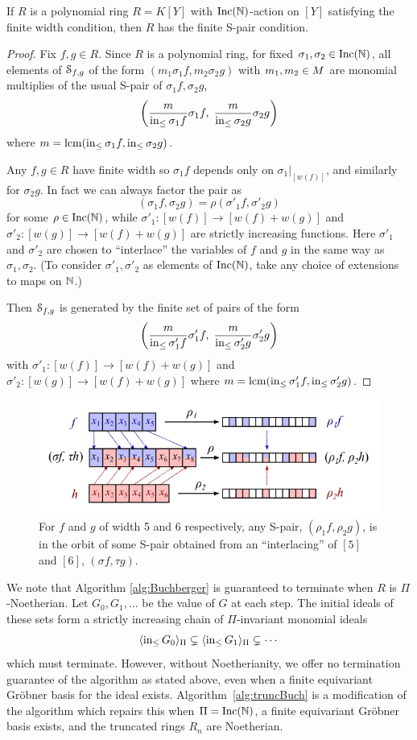 \begin{proposition}
 If $R$ is a polynomial ring $R = K[Y]$ with $\operatorname{Inc}(\mathbb N)$-action on $[Y]$ satisfying the finite width condition, then $R$ has the finite S-pair condition.
\end{proposition}
\begin{proof}
 Fix $f,g \in R$.
 Since $R$ is a polynomial ring, for fixed $\sigma_1,\sigma_2 \in \operatorname{Inc}(\mathbb N)$, all elements of $\mathcal S_{f,g}$ of the form $(m_1\sigma_1 f, m_2\sigma_2 g)$ with $m_1,m_2 \in M$ are monomial multiplies of the usual S-pair of $\sigma_1 f, \sigma_2 g$,
  \[ \left(\frac{m}{\operatorname{in}_{\leq} \sigma_1 f} \sigma_1 f,\; \frac{m}{\operatorname{in}_{\leq} \sigma_2 g} \sigma_2 g\right) \]
 where $m = \operatorname{lcm}(\operatorname{in}_{\leq} \sigma_1 f,\operatorname{in}_{\leq} \sigma_2 g)$.

 Any $f,g \in R$ have finite width so $\sigma_1 f$ depends only on $\sigma_1|_{[w(f)]}$, and similarly for $\sigma_2 g$.  In fact we can always factor the pair as
  \[ (\sigma_1 f, \sigma_2 g) = \rho(\sigma'_1 f, \sigma'_2 g) \]
 for some $\rho \in \operatorname{Inc}(\mathbb N)$, while $\sigma'_1:[w(f)] \to [w(f) + w(g)]$ and $\sigma'_2:[w(g)] \to [w(f) + w(g)]$ are strictly increasing functions.  Here $\sigma'_1$ and $\sigma'_2$ are chosen to ``interlace'' the variables of $f$ and $g$ in the same way as $\sigma_1,\sigma_2$.  (To consider $\sigma'_1,\sigma'_2$ as elements of $\operatorname{Inc}(\mathbb N)$, take any choice of extensions to maps on $\mathbb N$.)
 
 Then $\mathcal S_{f,g}$ is generated by the finite set of pairs of the form
  \[ \left(\frac{m}{\operatorname{in}_{\leq} \sigma'_1 f} \sigma'_1 f,\; \frac{m}{\operatorname{in}_{\leq} \sigma'_2 g} \sigma'_2 g\right) \]
 with $\sigma'_1:[w(f)] \to [w(f) + w(g)]$ and $\sigma'_2:[w(g)] \to [w(f) + w(g)]$ where $m = \operatorname{lcm}(\operatorname{in}_{\leq} \sigma'_1 f,\operatorname{in}_{\leq} \sigma'_2 g)$.
\end{proof}
\begin{figure}[ht]\label{fig:interlace}
  \centering
  \includegraphics[width=.7\columnwidth]{incmap.pdf}
  \caption{For $f$ and $g$ of width 5 and 6 respectively, any S-pair, $(\rho_1 f,\rho_2 g)$, is in the orbit of some S-pair obtained from an ``interlacing'' of $[5]$ and $[6]$, $(\sigma f,\tau g)$.}
\end{figure}

We note that Algorithm \ref{alg:Buchberger} is guaranteed to terminate when $R$ is $\Pi$-Noetherian.  Let $G_0,G_1,\ldots$ be the value of $G$ at each step.  The initial ideals of these sets form a strictly increasing chain of $\Pi$-invariant monomial ideals
 \[ \langle \operatorname{in}_{\leq} G_0 \rangle_\Pi \subsetneq \langle \operatorname{in}_{\leq} G_1 \rangle_\Pi \subsetneq \cdots \]
which must terminate.  However, without Noetherianity, we offer no termination guarantee of the algorithm as stated above, even when a finite equivariant Gr\"obner basis for the ideal exists.  Algorithm~\ref{alg:truncBuch} is a modification of the algorithm which repairs this when $\Pi = \operatorname{Inc}(\mathbb N)$, a finite equivariant Gr\"obner basis exists, and the truncated rings $R_n$ are Noetherian.

